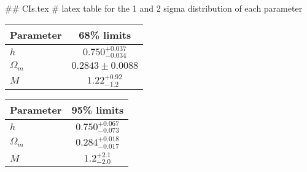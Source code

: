 ## CIs.tex
# latex table for the 1 and 2 sigma distribution of each parameter

\begin{tabular} { l  c}
 Parameter &  68\% limits\\
\hline
{\boldmath$h              $} & $0.750^{+0.037}_{-0.034}   $\\
{\boldmath$\Omega_m       $} & $0.2843\pm 0.0088          $\\
{\boldmath$M              $} & $1.22^{+0.92}_{-1.2}       $\\
\hline
\end{tabular}

\begin{tabular} { l  c}
 Parameter &  95\% limits\\
\hline
{\boldmath$h              $} & $0.750^{+0.067}_{-0.073}   $\\
{\boldmath$\Omega_m       $} & $0.284^{+0.018}_{-0.017}   $\\
{\boldmath$M              $} & $1.2^{+2.1}_{-2.0}         $\\
\hline
\end{tabular}
